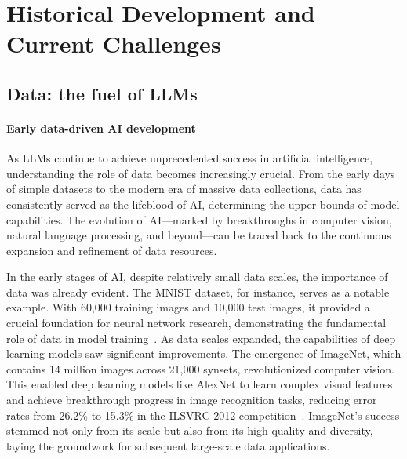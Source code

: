 
\section{Historical Development and Current Challenges}\label{sec:history}


\subsection{Data: the fuel of LLMs}

\paragraph{Early data-driven AI development}
As LLMs continue to achieve unprecedented success in artificial intelligence, understanding the role of data becomes increasingly crucial. From the early days of simple datasets to the modern era of massive data collections, data has consistently served as the lifeblood of AI, determining the upper bounds of model capabilities. The evolution of AI—marked by breakthroughs in computer vision, natural language processing, and beyond—can be traced back to the continuous expansion and refinement of data resources. 

In the early stages of AI, despite relatively small data scales, the importance of data was already evident. The MNIST dataset, for instance, serves as a notable example. With 60,000 training images and 10,000 test images, it provided a crucial foundation for neural network research, demonstrating the fundamental role of data in model training~\cite{lecun1998mnist}. As data scales expanded, the capabilities of deep learning models saw significant improvements. The emergence of ImageNet, which contains 14 million images across 21,000 synsets, revolutionized computer vision. This enabled deep learning models like AlexNet to learn complex visual features and achieve breakthrough progress in image recognition tasks, reducing error rates from 26.2\% to 15.3\% in the ILSVRC-2012 competition~\cite{deng2009imagenet,krizhevsky2012imagenet}. ImageNet's success stemmed not only from its scale but also from its high quality and diversity, laying the groundwork for subsequent large-scale data applications.

